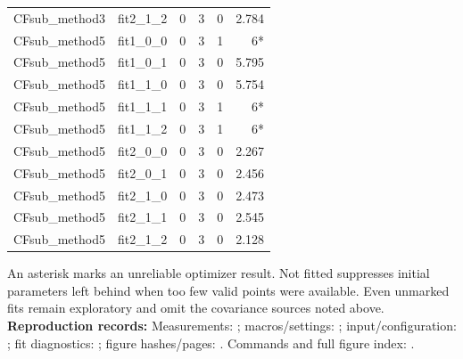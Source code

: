 \documentclass[11pt,a4paper]{article}
\begin{document}
{\begin{longtable}{llrrrr}
CFsub\_method3 & fit2\_1\_2 & 0 & 3 & 0 & 2.784\\
CFsub\_method5 & fit1\_0\_0 & 0 & 3 & 1 & 6*\\
CFsub\_method5 & fit1\_0\_1 & 0 & 3 & 0 & 5.795\\
CFsub\_method5 & fit1\_1\_0 & 0 & 3 & 0 & 5.754\\
CFsub\_method5 & fit1\_1\_1 & 0 & 3 & 1 & 6*\\
CFsub\_method5 & fit1\_1\_2 & 0 & 3 & 1 & 6*\\
CFsub\_method5 & fit2\_0\_0 & 0 & 3 & 0 & 2.267\\
CFsub\_method5 & fit2\_0\_1 & 0 & 3 & 0 & 2.456\\
CFsub\_method5 & fit2\_1\_0 & 0 & 3 & 0 & 2.473\\
CFsub\_method5 & fit2\_1\_1 & 0 & 3 & 0 & 2.545\\
CFsub\_method5 & fit2\_1\_2 & 0 & 3 & 0 & 2.128\\
\hline\end{longtable}}
An asterisk marks an unreliable optimizer result. Not fitted suppresses initial parameters left behind when too few valid points were available. Even unmarked fits remain exploratory and omit the covariance sources noted above.
{\small\textbf{Reproduction records:} Measurements: ; macros/settings: ; input/configuration: ; fit diagnostics: ; figure hashes/pages: . Commands and full figure index: .}
\end{document}
